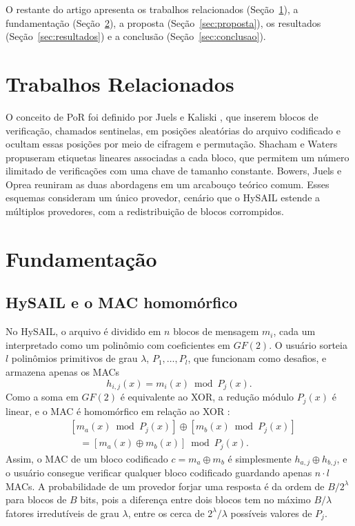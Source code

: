 \documentclass[portuguese]{sbc2025}%
\begin{document}
O restante do artigo apresenta os trabalhos relacionados (Seção~\ref{sec:relacionados}), a fundamentação (Seção~\ref{sec:fundamentacao}), a proposta (Seção~\ref{sec:proposta}), os resultados (Seção~\ref{sec:resultados}) e a conclusão (Seção~\ref{sec:conclusao}).

\section{Trabalhos Relacionados}
\label{sec:relacionados}

O conceito de PoR foi definido por Juels e Kaliski \citeyearpar{juels2007pors}, que inserem blocos de verificação, chamados sentinelas, em posições aleatórias do arquivo codificado e ocultam essas posições por meio de cifragem e permutação. Shacham e Waters \citeyearpar{shacham2008compact} propuseram etiquetas lineares associadas a cada bloco, que permitem um número ilimitado de verificações com uma chave de tamanho constante. Bowers, Juels e Oprea \citeyearpar{bowers2009proofs} reuniram as duas abordagens em um arcabouço teórico comum. Esses esquemas consideram um único provedor, cenário que o HySAIL \citep{amaral2019hysail} estende a múltiplos provedores, com a redistribuição de blocos corrompidos.

\section{Fundamentação}
\label{sec:fundamentacao}

\subsection{HySAIL e o MAC homomórfico}

No HySAIL, o arquivo é dividido em $n$ blocos de mensagem $m_i$, cada um interpretado como um polinômio com coeficientes em $GF(2)$. O usuário sorteia $l$ polinômios primitivos de grau $\lambda$, $P_1, \ldots, P_l$, que funcionam como desafios, e armazena apenas os MACs
\begin{equation}
h_{i,j}(x) = m_i(x) \bmod P_j(x).
\end{equation}
Como a soma em $GF(2)$ é equivalente ao XOR, a redução módulo $P_j(x)$ é linear, e o MAC é homomórfico em relação ao XOR \citep{amaral2019hysail}:
\begin{equation}
\begin{aligned}
&\left[m_a(x) \bmod P_j(x)\right] \oplus \left[m_b(x) \bmod P_j(x)\right] \\
&\quad = \left[m_a(x) \oplus m_b(x)\right] \bmod P_j(x).
\end{aligned}
\label{eq:homomorfismo}
\end{equation}
Assim, o MAC de um bloco codificado $c = m_a \oplus m_b$ é simplesmente $h_{a,j} \oplus h_{b,j}$, e o usuário consegue verificar qualquer bloco codificado guardando apenas $n \cdot l$ MACs. A probabilidade de um provedor forjar uma resposta é da ordem de $B/2^\lambda$ para blocos de $B$ bits, pois a diferença entre dois blocos tem no máximo $B/\lambda$ fatores irredutíveis de grau $\lambda$, entre os cerca de $2^\lambda/\lambda$ possíveis valores de $P_j$.
\end{document}
